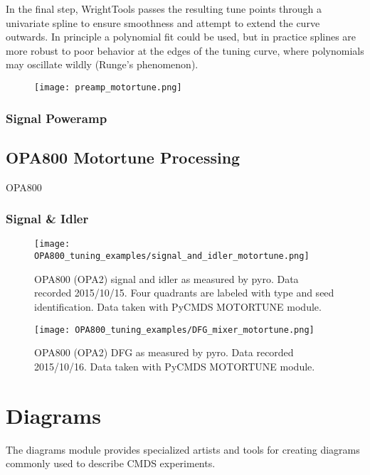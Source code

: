 In the final step, WrightTools passes the resulting tune points through a univariate spline to ensure smoothness and attempt to extend the curve outwards. In principle a polynomial fit could be used, but in practice splines are more robust to poor behavior at the edges of the tuning curve, where polynomials may oscillate wildly (Runge's phenomenon).

\begin{figure}
	\begin{centering}
		\texttt{[image: preamp\_motortune.png]}
		\caption{}
	\end{centering}
	\label{fig:TOPAS preamp motortune}
\end{figure}


\subsubsection{Signal Poweramp}

\subsection{OPA800 Motortune Processing}

OPA800 

\subsubsection{Signal \& Idler}

\begin{figure}
	\begin{centering}
		\texttt{[image: OPA800\_tuning\_examples/signal\_and\_idler\_motortune.png]}
		\caption{OPA800 (OPA2) signal and idler as measured by pyro. Data recorded 2015/10/15. Four quadrants are labeled with type and seed identification. Data taken with PyCMDS MOTORTUNE module.}
	\end{centering}
	\label{fig:opa800 signal and idler}
\end{figure}

\begin{figure}
	\begin{centering}
		\texttt{[image: OPA800\_tuning\_examples/DFG\_mixer\_motortune.png]}
		\caption{OPA800 (OPA2) DFG as measured by pyro. Data recorded 2015/10/16. Data taken with PyCMDS MOTORTUNE module.}
	\end{centering}
	\label{fig:opa800 DFG}
\end{figure}

\pagebreak
\section{Diagrams}

The diagrams module provides specialized artists and tools for creating diagrams commonly used to describe CMDS experiments.
